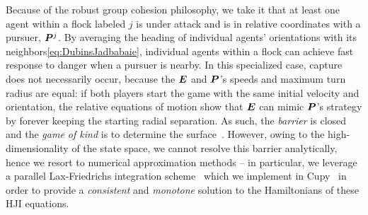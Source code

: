 Because of the robust group cohesion philosophy, we take it that at least one agent within a flock labeled $j$ is under attack and is in relative coordinates with a pursuer, $\bm{P}^j$. By averaging the heading of individual agents' orientations with its neighbors\cf \eqref{eq:DubinsJadbabaie}, individual agents within a flock can achieve  fast  response to danger when a pursuer is nearby. In this specialized case,  capture does not necessarily occur, because the $\bm{E}$ and $\bm{P}$'s speeds and maximum turn radius are equal: if both players start the game with the same initial velocity and orientation, the relative equations of motion show that $\bm{E}$ can mimic $\bm{P}$'s strategy by forever keeping the starting radial separation. As such, the \textit{barrier} is closed and the \textit{game of kind} is to determine the surface~\cite{Merz1972}. However, owing to the high-dimensionality of the state space, we cannot resolve this barrier analytically, hence we resort to numerical approximation methods -- in particular, we leverage a parallel Lax-Friedrichs integration scheme~\cite{Crandall1984} which we implement in Cupy~\cite{CuPy} in order to provide a \textit{consistent} and \textit{monotone} solution to the Hamiltonians of these HJI equations. 
%

